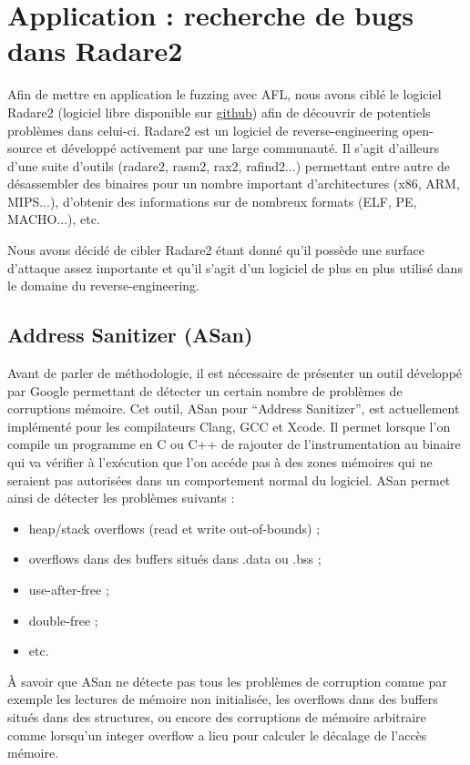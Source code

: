 \chapter{Application : recherche de bugs dans Radare2}

Afin de mettre en application le fuzzing avec AFL, nous avons ciblé le logiciel Radare2 (logiciel libre disponible sur \href{https://github.com/radare/radare2}{github}) afin de découvrir de potentiels problèmes dans celui-ci.
Radare2 est un logiciel de reverse-engineering open-source et développé activement par une large communauté.
Il s'agit d'ailleurs d'une suite d'outils (radare2, rasm2, rax2, rafind2...) permettant entre autre de désassembler des binaires pour un nombre important d'architectures (x86, ARM, MIPS...), d'obtenir des informations sur de nombreux formats (ELF, PE, MACHO...), etc.

Nous avons décidé de cibler Radare2 étant donné qu'il possède une surface d'attaque assez importante et qu'il s'agit d'un logiciel de plus en plus utilisé dans le domaine du reverse-engineering.

\section{Address Sanitizer (ASan)}

Avant de parler de méthodologie, il est nécessaire de présenter un outil développé par Google permettant de détecter un certain nombre de problèmes de corruptions mémoire.
Cet outil, ASan pour ``Address Sanitizer'', est actuellement implémenté pour les compilateurs Clang, GCC et Xcode.
Il permet lorsque l'on compile un programme en C ou C++ de rajouter de l'instrumentation au binaire qui va vérifier à l'exécution que l'on accéde pas à des zones mémoires qui ne seraient pas autorisées dans un comportement normal du logiciel.
ASan permet ainsi de détecter les problèmes suivants :

\begin{itemize}
\item heap/stack overflows (read et write out-of-bounds) ;
\item overflows dans des buffers situés dans .data ou .bss ;
\item use-after-free ;
\item double-free ;
\item etc.
\end{itemize}

À savoir que ASan ne détecte pas tous les problèmes de corruption comme par exemple les lectures de mémoire non initialisée, les overflows dans des buffers situés dans des structures, ou encore des corruptions de mémoire arbitraire comme lorsqu'un integer overflow a lieu pour calculer le décalage de l'accès mémoire.

